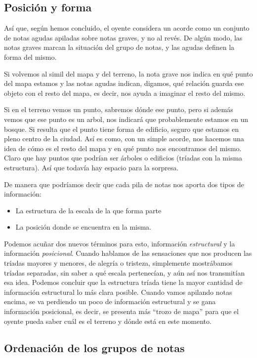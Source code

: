 \documentclass[]{article}
\providecommand{\tightlist}{%
  \setlength{
\itemsep}{0pt}\setlength{\parskip}{0pt}}
\begin{document}
\subsection{Posición y forma}

Así que, según hemos concluido, el oyente considera un acorde como un conjunto de notas agudas apiladas sobre notas graves, y no al revés. De algún modo, las notas graves marcan la situación del grupo de notas, y las agudas definen la forma del mismo.

Si volvemos al simil del mapa y del terreno, la nota grave nos indica en qué punto del mapa estamos y las notas agudas indican, digamos, qué relación guarda ese objeto con el resto del mapa, es decir, nos ayuda a imaginar el resto del mismo.

Si en el terreno vemos un punto, sabremos dónde ese punto, pero si además vemos que ese punto es un arbol, nos indicará que probablemente estamos en un bosque. Si resulta que el punto tiene forma de edificio, seguro que estamos en pleno centro de la ciudad. Así es como, con un simple acorde, nos hacemos una idea de cómo es el resto del mapa y en qué punto nos encontramos del mismo. Claro que hay puntos que podrían ser árboles o edificios (tríadas con la misma estructura). Así que todavía hay espacio para la sorpresa.

De manera que podríamos decir que cada pila de notas nos aporta dos tipos de información:

\begin{itemize}   \tightlist
  \item La estructura de la escala de la que forma parte
  \item La posición donde se encuentra en la misma.
\end{itemize}

Podemos acuñar dos nuevos términos para esto, información \emph{estructural} y la información \emph{posicional}. Cuando hablamos de las sensaciones que nos producen las tríadas mayores y menores, de alegría o tristeza, simplemente mostrábamos tríadas separadas, sin saber a qué escala pertenecían, y aún así nos transmitían esa idea. Podemos concluir que la estructura tríada tiene la mayor cantidad de información estructural lo más clara posible. Cuando vamos apilando notas encima, se va perdiendo un poco de información estructural y se gana información posicional, es decir, se presenta más ``trozo de mapa'' para que el oyente pueda saber cuál es el terreno y dónde está en este momento.

\subsection{Ordenación de los grupos de notas}
\end{document}
